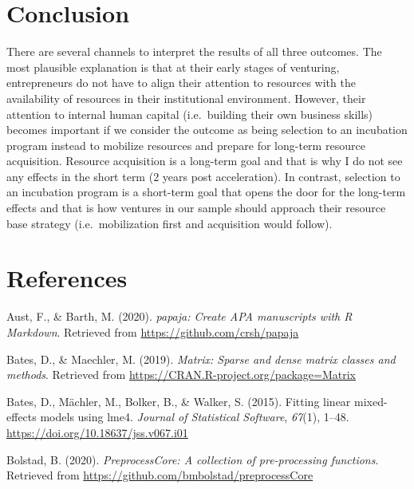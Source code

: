 \documentclass[
  english,
  man]{apa6}
\begin{document}
\hypertarget{conclusion}{%
\section{Conclusion}\label{conclusion}}

There are several channels to interpret the results of all three outcomes. The most plausible explanation is that at their early stages of venturing, entrepreneurs do not have to align their attention to resources with the availability of resources in their institutional environment. However, their attention to internal human capital (i.e.~building their own business skills) becomes important if we consider the outcome as being selection to an incubation program instead to mobilize resources and prepare for long-term resource acquisition. Resource acquisition is a long-term goal and that is why I do not see any effects in the short term (2 years post acceleration). In contrast, selection to an incubation program is a short-term goal that opens the door for the long-term effects and that is how ventures in our sample should approach their resource base strategy (i.e.~mobilization first and acquisition would follow).

\newpage

\hypertarget{references}{%
\section{References}\label{references}}

\begingroup
\setlength{\parindent}{-0.5in}
\setlength{\leftskip}{0.5in}

\hypertarget{refs}{}
\leavevmode\hypertarget{ref-R-papaja}{}%
Aust, F., \& Barth, M. (2020). \emph{papaja: Create APA manuscripts with R Markdown}. Retrieved from \url{https://github.com/crsh/papaja}

\leavevmode\hypertarget{ref-R-Matrix}{}%
Bates, D., \& Maechler, M. (2019). \emph{Matrix: Sparse and dense matrix classes and methods}. Retrieved from \url{https://CRAN.R-project.org/package=Matrix}

\leavevmode\hypertarget{ref-R-lme4}{}%
Bates, D., Mächler, M., Bolker, B., \& Walker, S. (2015). Fitting linear mixed-effects models using lme4. \emph{Journal of Statistical Software}, \emph{67}(1), 1--48. \url{https://doi.org/10.18637/jss.v067.i01}

\leavevmode\hypertarget{ref-R-preprocessCore}{}%
Bolstad, B. (2020). \emph{PreprocessCore: A collection of pre-processing functions}. Retrieved from \url{https://github.com/bmbolstad/preprocessCore}
\end{document}
